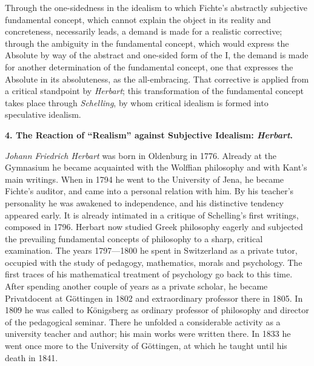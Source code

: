 Through the one-sidedness in the idealism to which Fichte's abstractly
subjective fundamental concept, which cannot explain the object in its
reality and concreteness, necessarily leads, a demand is made for a
realistic corrective; through the ambiguity in the fundamental concept,
which would express the Absolute by way of the abstract and one-sided
form of the I, the demand is made for another determination of the
fundamental concept, one that expresses the Absolute in its
absoluteness, as the all-embracing. That corrective is applied from a
critical standpoint by \emph{Herbart}; this transformation of the
fundamental concept takes place through \emph{Schelling}, by whom
critical idealism is formed into speculative idealism.

\divrule

\begin{center}
  \textbf{4. The Reaction of ``Realism'' against Subjective Idealism: \emph{Herbart}.}
\end{center}

\emph{Johann Friedrich Herbart} was born in Oldenburg in 1776. Already
at the Gymnasium he became acquainted with the Wolffian philosophy and
with Kant's main writings. When in 1794 he went to the University of
Jena, he became Fichte's auditor, and came into a personal relation with
him. By his teacher's personality he was awakened to independence, and
his distinctive tendency appeared early. It is already intimated in a
critique of Schelling's first writings, composed in 1796. Herbart now
studied Greek philosophy eagerly and subjected the prevailing
fundamental concepts of philosophy to a sharp, critical examination. The
years 1797---1800 he spent in Switzerland as a private tutor, occupied
with the study of pedagogy, mathematics, morals and psychology. The
first traces of his mathematical treatment of psychology go back to
this time. After spending another couple of years as a
private scholar, he became Privatdocent at Göttingen in 1802 and
extraordinary professor there in 1805. In 1809 he was called to
Königsberg as ordinary professor of philosophy and director of the
pedagogical seminar. There he unfolded a considerable activity as a
university teacher and author; his main works were written there. In
1833 he went once more to the University of Göttingen, at which he
taught until his death in 1841.

